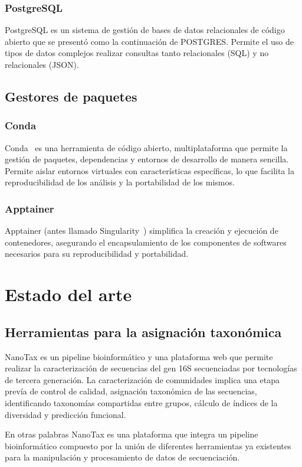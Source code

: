 \subsubsection{PostgreSQL}
PostgreSQL es un sistema de gestión de bases de datos relacionales de código abierto que se presentó como la continuación de POSTGRES. Permite el uso de tipos de datos complejos realizar consultas tanto relacionales (SQL) y no relacionales (JSON).

\subsection{Gestores de paquetes}
\subsubsection{Conda}
Conda~\cite{anaconda}  es una herramienta de código abierto, multiplataforma  que permite la gestión de paquetes, dependencias y entornos de desarrollo de manera sencilla. Permite aislar entornos virtuales con características específicas, lo que facilita la reproducibilidad de los análisis y la portabilidad de los mismos.
\subsubsection{Apptainer}
Apptainer (antes llamado Singularity~\cite{kurtzer2017singularity}) simplifica la creación y ejecución de contenedores, asegurando el encapsulamiento de los componentes de softwares necesarios para su reproducibilidad y portabilidad.  


\section{Estado del arte}


\subsection{Herramientas para la asignación taxonómica}
NanoTax es un pipeline bioinformático y una plataforma web que permite realizar la caracterización de secuencias del gen 16S secuenciadas por tecnologías de tercera generación.
La caracterización de comunidades implica una etapa prevía de control de calidad,  asignación taxonómica de las secuencias, identificando taxonomías compartidas entre grupos, cálculo de índices de la diversidad y predicción funcional.

En otras palabras NanoTax es una plataforma que integra un pipeline bioinformático compuesto por la unión de diferentes herramientas ya existentes para la manipulación y procesamiento de datos de secuenciación.

